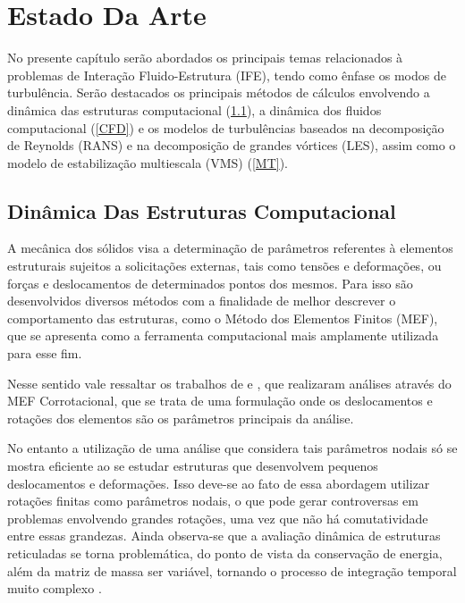 \chapter{Estado Da Arte}

No presente capítulo serão abordados os principais temas relacionados à problemas de Interação Fluido-Estrutura (IFE), tendo como ênfase os modos de turbulência. Serão destacados os principais métodos de cálculos envolvendo a dinâmica das estruturas computacional (\ref{CSD}), a dinâmica dos fluidos computacional (\ref{CFD}) e os modelos de turbulências baseados na decomposição de Reynolds (RANS) e na decomposição de grandes vórtices (LES), assim como o modelo de estabilização multiescala (VMS) (\ref{MT}).

\section{Dinâmica Das Estruturas Computacional} \label{CSD}

A mecânica dos sólidos visa a determinação de parâmetros referentes à elementos estruturais sujeitos a solicitações externas, tais como tensões e deformações, ou forças e deslocamentos de determinados pontos dos mesmos. Para isso são desenvolvidos diversos métodos com a finalidade de melhor descrever o comportamento das estruturas, como o Método dos Elementos Finitos (MEF), que se apresenta como a ferramenta computacional mais amplamente utilizada para esse fim.

Nesse sentido vale ressaltar os trabalhos de  e , que realizaram análises através do MEF Corrotacional, que se trata de uma formulação onde os deslocamentos e rotações dos elementos são os parâmetros principais da análise.

No entanto a utilização de uma análise que considera tais parâmetros nodais só se mostra eficiente ao se estudar estruturas que desenvolvem pequenos deslocamentos e deformações. Isso deve-se ao fato de essa abordagem utilizar rotações finitas como parâmetros nodais, o que pode gerar controversas em problemas envolvendo grandes rotações, uma vez que não há comutatividade entre essas grandezas. Ainda observa-se que a avaliação dinâmica de estruturas reticuladas se torna problemática, do ponto de vista da conservação de energia, além da matriz de massa ser variável, tornando o processo de integração temporal muito complexo \cite{sanches2013unconstrained}.


